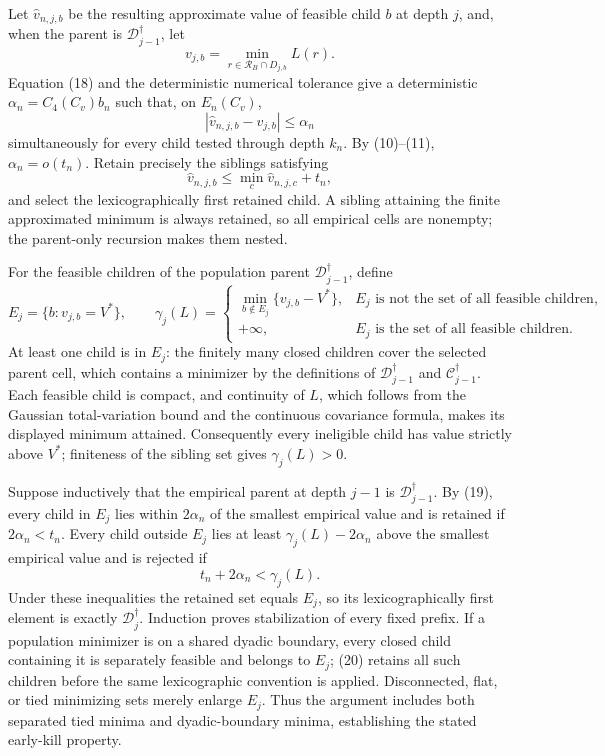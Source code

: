 Let \(\widehat v_{n,j,b}\) be the resulting approximate value of feasible child \(b\) at depth \(j\), and, when the parent is \(\mathcal D_{j-1}^\dagger\), let
\[
v_{j,b}=\min_{r\in\mathcal R_B\cap D_{j,b}}L(r).
\]
Equation (18) and the deterministic numerical tolerance give a deterministic \(\alpha_n=C_4(C_v)b_n\) such that, on \(E_n(C_v)\),
\[
|\widehat v_{n,j,b}-v_{j,b}|\le\alpha_n
\tag{19}
\]
simultaneously for every child tested through depth \(k_n\). By (10)--(11), \(\alpha_n=o(t_n)\). Retain precisely the siblings satisfying
\[
\widehat v_{n,j,b}\le\min_c\widehat v_{n,j,c}+t_n,
\tag{20}
\]
and select the lexicographically first retained child. A sibling attaining the finite approximated minimum is always retained, so all empirical cells are nonempty; the parent-only recursion makes them nested.

For the feasible children of the population parent \(\mathcal D_{j-1}^\dagger\), define
\[
E_j=\{b:v_{j,b}=V^*\},\qquad
\gamma_j(L)=
\begin{cases}
\min_{b\notin E_j}\{v_{j,b}-V^*\},&
E_j\text{ is not the set of all feasible children},\\
+\infty,&E_j\text{ is the set of all feasible children}.
\end{cases}
\tag{21}
\]
At least one child is in \(E_j\): the finitely many closed children cover the selected parent cell, which contains a minimizer by the definitions of \(\mathcal D_{j-1}^\dagger\) and \(\mathcal C_{j-1}^\dagger\). Each feasible child is compact, and continuity of \(L\), which follows from the Gaussian total-variation bound and the continuous covariance formula, makes its displayed minimum attained. Consequently every ineligible child has value strictly above \(V^*\); finiteness of the sibling set gives \(\gamma_j(L)>0\).

Suppose inductively that the empirical parent at depth \(j-1\) is \(\mathcal D_{j-1}^\dagger\). By (19), every child in \(E_j\) lies within \(2\alpha_n\) of the smallest empirical value and is retained if \(2\alpha_n<t_n\). Every child outside \(E_j\) lies at least \(\gamma_j(L)-2\alpha_n\) above the smallest empirical value and is rejected if
\[
t_n+2\alpha_n<\gamma_j(L).
\tag{22}
\]
Under these inequalities the retained set equals \(E_j\), so its lexicographically first element is exactly \(\mathcal D_j^\dagger\). Induction proves stabilization of every fixed prefix. If a population minimizer is on a shared dyadic boundary, every closed child containing it is separately feasible and belongs to \(E_j\); (20) retains all such children before the same lexicographic convention is applied. Disconnected, flat, or tied minimizing sets merely enlarge \(E_j\). Thus the argument includes both separated tied minima and dyadic-boundary minima, establishing the stated early-kill property.

